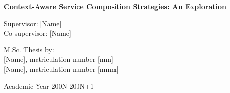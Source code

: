 {\begin{center}
\vspace{1cm} 
\LARGE
\textbf{Context-Aware Service Composition Strategies: An Exploration}\\


\vspace{2.0cm}

\end{center}


\vspace{3.0cm} 
\large
\begin{flushleft}
Supervisor: [Name]   \\
Co-supervisor:  [Name]
\end{flushleft}

\vspace{1.0cm}

\begin{flushright}
M.Sc. Thesis by: \\ 
{[Name]}, matriculation number [nnn] \\ 
{[Name]}, matriculation number [mmm] \\
\end{flushright}

\vspace{2cm}

\begin{center}
Academic Year 200N-200N+1
\end{center} 

\clearpage
}
